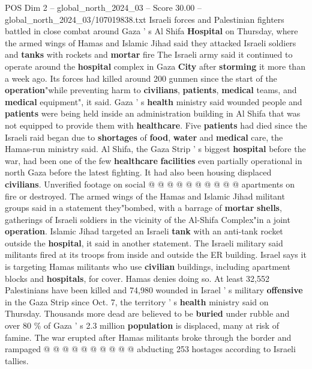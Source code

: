 \begin{textsample}{POS Dim 2 – global\_north\_2024\_03 – Score 30.00 – global\_north\_2024\_03/107019838.txt}  \label{ex:f2_pos_108}
Israeli forces and Palestinian fighters battled in close combat around Gaza ' s Al Shifa \textbf{Hospital} on Thursday, where the armed wings of Hamas and Islamic Jihad said they attacked Israeli soldiers and \textbf{tanks} with rockets and \textbf{mortar} fire The Israeli army said it continued to operate around the \textbf{hospital} complex in Gaza \textbf{City} after \textbf{storming} it more than a week ago.
Its forces had killed around 200 gunmen since the start of the \textbf{operation}"while preventing harm to \textbf{civilians}, \textbf{patients}, \textbf{medical} teams, and \textbf{medical} equipment", it said.
Gaza ' s \textbf{health} ministry said wounded people and \textbf{patients} were being held inside an administration building in Al Shifa that was not equipped to provide them with \textbf{healthcare}.
Five \textbf{patients} had died since the Israeli raid began due to \textbf{shortages} of \textbf{food}, \textbf{water} and \textbf{medical} care, the Hamas-run ministry said.
Al Shifa, the Gaza Strip ' s biggest \textbf{hospital} before the war, had been one of the few \textbf{healthcare} \textbf{facilities} even partially operational in north Gaza before the latest fighting.
It had also been housing displaced \textbf{civilians}.
Unverified footage on social @ @ @ @ @ @ @ @ @ @ apartments on fire or destroyed.
The armed wings of the Hamas and Islamic Jihad militant groups said in a statement they"bombed, with a barrage of \textbf{mortar} \textbf{shells}, gatherings of Israeli soldiers in the vicinity of the Al-Shifa Complex"in a joint \textbf{operation}.
Islamic Jihad targeted an Israeli \textbf{tank} with an anti-tank rocket outside the \textbf{hospital}, it said in another statement.
The Israeli military said militants fired at its troops from inside and outside the ER building.
Israel says it is targeting Hamas militants who use \textbf{civilian} buildings, including apartment blocks and \textbf{hospitals}, for cover.
Hamas denies doing so.
At least 32,552 Palestinians have been killed and 74,980 wounded in Israel ' s military \textbf{offensive} in the Gaza Strip since Oct. 7, the territory ' s \textbf{health} ministry said on Thursday.
Thousands more dead are believed to be \textbf{buried} under rubble and over 80 \% of Gaza ' s 2.3 million \textbf{population} is displaced, many at risk of famine.
The war erupted after Hamas militants broke through the border and rampaged @ @ @ @ @ @ @ @ @ @ abducting 253 hostages according to Israeli tallies.

\end{textsample}
